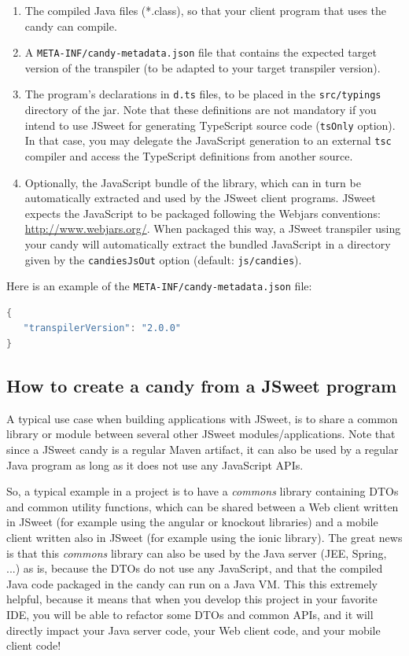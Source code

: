\documentclass[a4paper]{report}
\begin{document}
\begin{enumerate}
\item The compiled Java files (*.class), so that your client program that uses the candy can compile.
\item A \texttt{META-INF/candy-metadata.json} file that contains the expected target version of the transpiler (to be adapted to your target transpiler version).
\item The program's declarations in \texttt{d.ts} files, to be placed in the \texttt{src/typings} directory of the jar. Note that these definitions are not mandatory if you intend to use JSweet for generating TypeScript source code (\texttt{tsOnly} option). In that case, you may delegate the JavaScript generation to an external \texttt{tsc} compiler and access the TypeScript definitions from another source.
\item Optionally, the JavaScript bundle of the library, which can in turn be automatically extracted and used by the JSweet client programs. JSweet expects the JavaScript to be packaged following the Webjars conventions: \url{http://www.webjars.org/}. When packaged this way, a JSweet transpiler using your candy will automatically extract the bundled JavaScript in a directory given by the \texttt{candiesJsOut} option (default: \texttt{js/candies}).
\end{enumerate}

Here is an example of the \texttt{META-INF/candy-metadata.json} file:

\begin{lstlisting}[language=Java]
{
   "transpilerVersion": "2.0.0"
}
\end{lstlisting}

\subsection{How to create a candy from a JSweet program}

A typical use case when building applications with JSweet, is to share a common library or module between several other JSweet modules/applications. Note that since a JSweet candy is a regular Maven artifact, it can also be used by a regular Java program as long as it does not use any JavaScript APIs. 

So, a typical example in a project is to have a \emph{commons} library containing DTOs and common utility functions, which can be shared between a Web client written in JSweet (for example using the angular or knockout libraries) and a mobile client written also in JSweet (for example using the ionic library). The great news is that this \emph{commons} library can also be used by the Java server (JEE, Spring, ...) as is, because the DTOs do not use any JavaScript, and that the compiled Java code packaged in the candy can run on a Java VM. This this extremely helpful, because it means that when you develop this project in your favorite IDE, you will be able to refactor some DTOs and common APIs, and it will directly impact your Java server code, your Web client code, and your mobile client code!
\end{document}
